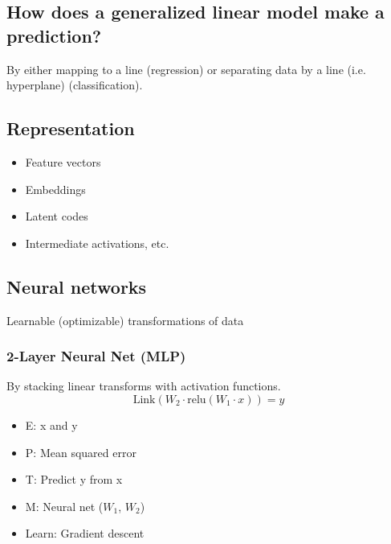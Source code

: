 \subsection{How does a generalized linear model make a prediction?}
\begin{definition}
    By either mapping to a line (regression) or separating data by a line (i.e. hyperplane) (classification).
\end{definition}

\subsection{Representation}
\begin{definition}
    \begin{itemize}
        \item Feature vectors
        \item Embeddings
        \item Latent codes
        \item Intermediate activations, etc.
    \end{itemize}
\end{definition}

\subsection{Neural networks}
\begin{definition}
    Learnable (optimizable) transformations of data
\end{definition}

\subsubsection{2-Layer Neural Net (MLP)}
\begin{example} By stacking linear transforms with activation functions. 
    \begin{equation*}
        \text{Link}(W_2 \cdot \text{relu} (W_1 \cdot x)) = y
    \end{equation*}
    \begin{itemize}
        \item E: x and y
        \item P: Mean squared error 
        \item T: Predict y from x
        \item M: Neural net ($W_1$, $W_2$)  
        \item Learn: Gradient descent
    \end{itemize}
\end{example}

